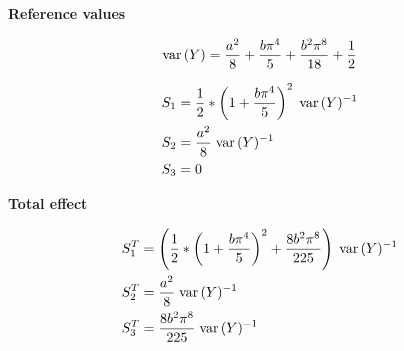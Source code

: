 \begin{frame}\textbf{Reference values}\vspace{0.3cm}

\begin{align*}
	\mathrm{var}\thinspace(Y) = \frac{a^2}{8} + \frac{b \pi^4}{5} + \frac{b^2\pi^8}{18} + \frac{1}{2}
\end{align*}

\begin{align*}
S_1 & = \frac{1}{2} *  \left(1 + \frac{b\pi^4}{5}\right)^2 \; \mathrm{var}\thinspace(Y)^{-1} \\
S_2 & = \frac{a^2}{8} \; \mathrm{var}\thinspace(Y)^{-1} \\
S_3 & = 0
\end{align*}


\end{frame}
\begin{frame}\textbf{Total effect}\vspace{0.3cm}

\begin{align*}
S^T_1 & = \left(\frac{1}{2} *  \left(1 +  \frac{b\pi^4}{5}\right)^2  +  \frac{8 b^2 \pi^8}{225}\right) \; \mathrm{var}\thinspace(Y)^{-1}\\
S^T_2 & = \frac{a^2}{8} \; \mathrm{var}\thinspace(Y)^{-1} \\
S^T_3 & =  \frac{8 b^2 \pi^8}{225} \; \mathrm{var}\thinspace(Y)^{-1}
\end{align*}


\end{frame}
